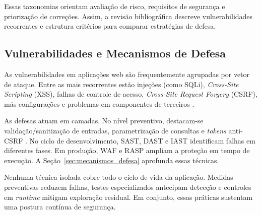 Essas taxonomias orientam avaliação de risco, requisitos de segurança e priorização de correções. Assim, a revisão bibliográfica descreve vulnerabilidades recorrentes e estrutura critérios para comparar estratégias de defesa.

\subsection{Vulnerabilidades e Mecanismos de Defesa}

As vulnerabilidades em aplicações web são frequentemente agrupadas por vetor de ataque. Entre as mais recorrentes estão injeções (como SQLi), \textit{Cross-Site Scripting} (XSS), falhas de controle de acesso, \textit{Cross-Site Request Forgery} (CSRF), más configurações e problemas em componentes de terceiros \cite{Halfond2006SQLInjectionClassification,Gupta2015XSSAttacksDefense,Alwan2021OWASPTopTenSurvey}.

As defesas atuam em camadas. No nível preventivo, destacam-se validação/sanitização de entradas, parametrização de consultas e \textit{tokens} anti-CSRF \cite{Shar2016WebAppDefense}. No ciclo de desenvolvimento, SAST, DAST e IAST identificam falhas em diferentes fases. Em produção, WAF e RASP ampliam a proteção em tempo de execução. A Seção~\ref{sec:mecanismos_defesa} aprofunda essas técnicas.

Nenhuma técnica isolada cobre todo o ciclo de vida da aplicação. Medidas preventivas reduzem falhas, testes especializados antecipam detecção e controles em \textit{runtime} mitigam exploração residual. Em conjunto, essas práticas sustentam uma postura contínua de segurança.
